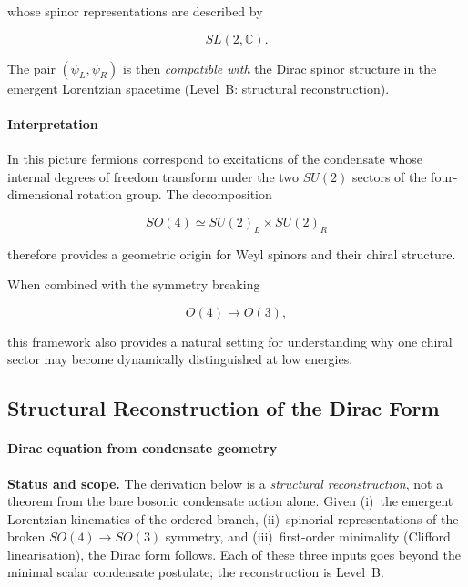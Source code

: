 \documentclass[11pt,a4paper]{article}
\numberwithin{equation}{section}
\begin{document}
whose spinor representations are described by

\begin{equation}
SL(2,\mathbb{C}).
\end{equation}

The pair $(\psi_L,\psi_R)$ is then \emph{compatible with} the Dirac spinor structure
in the emergent Lorentzian spacetime (Level~B: structural reconstruction).

\paragraph{Interpretation}

In this picture fermions correspond to excitations of the condensate
whose internal degrees of freedom transform under the two $SU(2)$
sectors of the four-dimensional rotation group.  The decomposition

\begin{equation}
SO(4)\simeq SU(2)_L \times SU(2)_R
\end{equation}

therefore provides a geometric origin for Weyl spinors and their chiral
structure.

When combined with the symmetry breaking

\begin{equation}
O(4)\rightarrow O(3),
\end{equation}

this framework also provides a natural setting for understanding why
one chiral sector may become dynamically distinguished at low energies.

\subsection{Structural Reconstruction of the Dirac Form}
\label{sec:dirac_eq}


\paragraph{Dirac equation from condensate geometry}

\textbf{Status and scope.}
The derivation below is a \emph{structural reconstruction}, not a
theorem from the bare bosonic condensate action alone.  Given
(i)~the emergent Lorentzian kinematics of the ordered branch,
(ii)~spinorial representations of the broken $SO(4)\to SO(3)$ symmetry,
and (iii)~first-order minimality (Clifford linearisation), the Dirac
form follows.  Each of these three inputs goes beyond the minimal
scalar condensate postulate; the reconstruction is Level~B.
\end{document}
